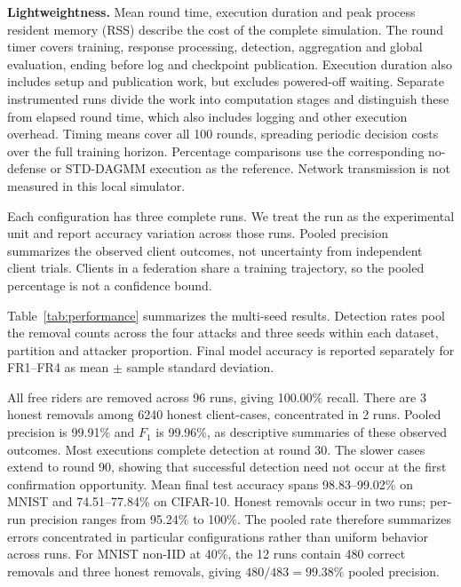 \documentclass[conference]{IEEEtran}
\makeatletter
\renewcommand{\subsection}{\@startsection{subsection}{2}{\z@}{1.5ex}{0.7ex}{\normalfont\normalsize\itshape}}
\makeatother
\begin{document}
\textbf{Lightweightness.} Mean round time, execution duration and peak
process resident memory (RSS) describe the cost of the complete simulation.
The round timer covers training, response processing, detection,
aggregation and global evaluation, ending before log and checkpoint
publication. Execution duration also includes setup and publication work,
but excludes powered-off waiting. Separate instrumented runs divide the
work into computation stages and distinguish these from elapsed round
time, which also includes logging and other execution overhead. Timing means
cover all 100 rounds, spreading periodic decision costs over the full
training horizon. Percentage comparisons use the corresponding
no-defense or STD-DAGMM execution as the reference. Network transmission
is not measured in this local simulator.

Each configuration has three complete runs. We treat the run as the
experimental unit and report accuracy variation across those runs.
Pooled precision summarizes the observed client outcomes, not uncertainty
from independent client trials. Clients in a federation share a training
trajectory, so the pooled percentage is not a confidence bound.
\endgroup

\subsection{Permanent Detection and Model Utility}
Table~\ref{tab:performance} summarizes the multi-seed results. Detection
rates pool the removal counts across the four attacks and three seeds
within each dataset, partition and attacker proportion. Final model accuracy is reported
separately for FR1--FR4 as mean $\pm$ sample standard deviation.

All free riders are removed across 96 runs, giving
100.00\% recall. There are 3 honest removals among
6240 honest client-cases, concentrated in
2 runs. Pooled precision is 99.91\% and
$F_1$ is 99.96\%, as descriptive summaries of these observed outcomes.
Most executions complete detection at round 30. The slower cases extend
to round 90, showing that successful detection need
not occur at the first confirmation opportunity. Mean final test
accuracy spans 98.83--99.02\% on MNIST
and 74.51--77.84\% on CIFAR-10.
Honest removals occur in two runs; per-run precision ranges from 95.24\%
to 100\%. The pooled rate therefore summarizes errors concentrated in
particular configurations rather than uniform behavior across runs.
For MNIST non-IID at 40\%, the 12 runs contain 480 correct removals
and three honest removals, giving $480/483=99.38\%$ pooled precision.
\end{document}
